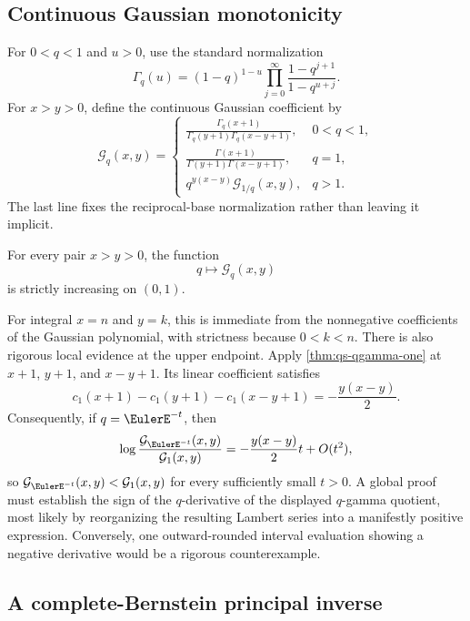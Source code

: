 \subsection{Continuous Gaussian monotonicity}

For \(0<q<1\) and \(u>0\), use the standard normalization
\[
 \Gamma_q(u)
  =(1-q)^{1-u}
    \prod_{j=0}^{\infty}\frac{1-q^{j+1}}{1-q^{u+j}}.
\]
For \(x>y>0\), define the continuous Gaussian coefficient by
\[
 \mathcal G_q(x,y)=
 \begin{cases}
 \displaystyle
 \frac{\Gamma_q(x+1)}
      {\Gamma_q(y+1)\Gamma_q(x-y+1)},&0<q<1,\\[1.2ex]
 \displaystyle
 \frac{\Gamma(x+1)}
      {\Gamma(y+1)\Gamma(x-y+1)},&q=1,\\[1.2ex]
 \displaystyle
 q^{y(x-y)}\mathcal G_{1/q}(x,y),&q>1.
 \end{cases}
\]
The last line fixes the reciprocal-base normalization rather than leaving it
implicit.

\begin{conjecture}
\label{conj:continuous-gaussian-monotonicity}
For every pair \(x>y>0\), the function
\[
 q\longmapsto\mathcal G_q(x,y)
\]
is strictly increasing on \((0,1)\).
\end{conjecture}

For integral \(x=n\) and \(y=k\), this is immediate from the nonnegative
coefficients of the Gaussian polynomial, with strictness because
\(0<k<n\).  There is also rigorous local evidence at the upper endpoint.
Apply \cref{thm:qs-qgamma-one} at \(x+1\), \(y+1\), and \(x-y+1\).
Its linear coefficient satisfies
\[
 c_1(x+1)-c_1(y+1)-c_1(x-y+1)
 =-\frac{y(x-y)}2.
\]
Consequently, if \(q=\EulerE^{-t}\), then
\[
 \log\frac{\mathcal G_{\EulerE^{-t}}(x,y)}{\mathcal G_1(x,y)}
  =-\frac{y(x-y)}2t+O(t^2),
\]
so \(\mathcal G_{\EulerE^{-t}}(x,y)<\mathcal G_1(x,y)\) for every sufficiently
small \(t>0\).  A global proof must establish the sign of the
\(q\)-derivative of the displayed
\(q\)-gamma quotient, most likely by reorganizing the resulting Lambert
series into a manifestly positive expression.  Conversely, one
outward-rounded interval evaluation showing a negative derivative would be a
rigorous counterexample.

\subsection{A complete-Bernstein principal inverse}

